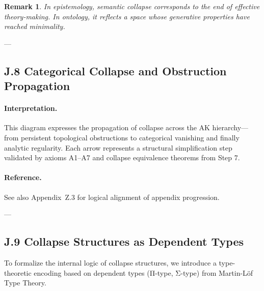 \documentclass[11pt]{article}
\newtheorem{remark}[theorem]{Remark}
\begin{document}
\begin{axiom}
\begin{axiom}
\begin{remark}
In epistemology, semantic collapse corresponds to the end of effective theory-making.  
In ontology, it reflects a space whose generative properties have reached minimality.
\end{remark}

---

\subsection*{J.8 Categorical Collapse and Obstruction Propagation}

\begin{center}
\end{center}

\paragraph{Interpretation.}
This diagram expresses the propagation of collapse across the AK hierarchy—from persistent topological obstructions to categorical vanishing and finally analytic regularity.
Each arrow represents a structural simplification step validated by axioms A1–A7 and collapse equivalence theorems from Step 7.

\paragraph{Reference.}
See also Appendix~Z.3 for logical alignment of appendix progression.

---

\subsection*{J.9 Collapse Structures as Dependent Types}

To formalize the internal logic of collapse structures, we introduce a type-theoretic encoding  
based on dependent types (Π-type, Σ-type) from Martin-Löf Type Theory.


\end{axiom}
\end{axiom}
\end{document}
